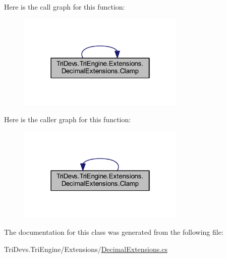 Here is the call graph for this function\-:
\nopagebreak
\begin{figure}[H]
\begin{center}
\leavevmode
\includegraphics[width=226pt]{class_tri_devs_1_1_tri_engine_1_1_extensions_1_1_decimal_extensions_a74cc27861e586638904b512234f99a15_cgraph}
\end{center}
\end{figure}




Here is the caller graph for this function\-:
\nopagebreak
\begin{figure}[H]
\begin{center}
\leavevmode
\includegraphics[width=226pt]{class_tri_devs_1_1_tri_engine_1_1_extensions_1_1_decimal_extensions_a74cc27861e586638904b512234f99a15_icgraph}
\end{center}
\end{figure}




The documentation for this class was generated from the following file\-:\begin{DoxyCompactItemize}
\item 
Tri\-Devs.\-Tri\-Engine/\-Extensions/\hyperlink{_decimal_extensions_8cs}{Decimal\-Extensions.\-cs}\end{DoxyCompactItemize}
